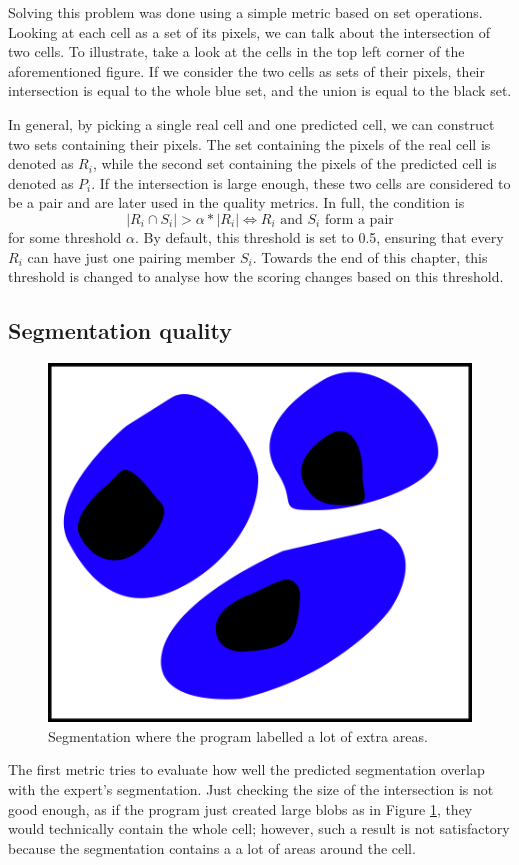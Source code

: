\documentclass[
  digital,     %
  oneside,     %
  nosansbold,  %
  nocolorbold, %
  lof,         %
  lot,         %
]{fithesis4}
\begin{document}
Solving this problem was done using a simple metric based on set operations.
Looking at each cell as a set of its pixels, we can talk about the intersection
of two cells. To illustrate, take a look at the cells in the top left corner of
the aforementioned figure. If we consider the two cells as sets of their
pixels, their intersection is equal to the whole blue set, and the union is
equal to the black set.

In general, by picking a single real cell and one predicted cell, we can construct
two sets containing their pixels. The set containing the pixels of the real cell is
denoted as $R_i$, while the second set containing the pixels of the predicted
cell is denoted as $P_i$. If the intersection is large enough, these two
cells are considered to be a pair and are later used in the quality
metrics. In full, the condition is
$$|R_i \cap S_i| > \alpha * |R_i| \Leftrightarrow R_i \text{ and } S_i \text{ form a pair}$$
for some threshold $\alpha$. By default, this threshold is set to 0.5, ensuring
that every $R_i$ can have just one pairing member $S_i$. Towards the end of this
chapter, this threshold is changed to analyse how the scoring changes based
on this threshold.

\subsection{Segmentation quality}
\begin{figure}
    \begin{center}
        \includegraphics{resources/inkscape/evaluation_imprecise_segmentation.png}
    \end{center}
    \caption{Segmentation where the program labelled a lot of extra areas.}
    \label{fig:evaluation_imprecise}
\end{figure}
The first metric tries to evaluate how well the predicted segmentation overlap
with the expert's segmentation. Just checking the size of the intersection is
not good enough, as if the program just created large blobs as in Figure
\ref{fig:evaluation_imprecise}, they would technically contain the whole cell;
however, such a result is not satisfactory because the segmentation contains a
a lot of areas around the cell.
\end{document}
